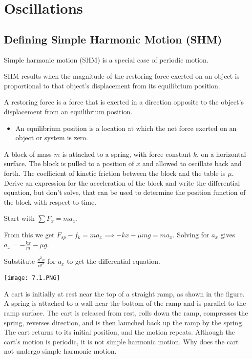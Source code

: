 \documentclass[../mech.tex]{subfiles}
\begin{document}
\chapter{Oscillations}
\section{Defining Simple Harmonic Motion (SHM)}
Simple harmonic motion (SHM) is a special case of periodic motion.

SHM results when the magnitude of the restoring force exerted on an object is proportional to that object's displacement from its equilibrium position.

A restoring force is a force that is exerted in a direction opposite to the object's displacement from an equilibrium position.
\begin{itemize}
    \item An equilibrium position is a location at which the net force exerted on an object or system is zero.
\end{itemize}

\begin{example}
    A block of mass $m$ is attached to a spring, with force constant $k$, on a horizontal surface. The block is pulled to a position of $x$ and allowed to oscillate back and forth.
    The coefficient of kinetic friction between the block and the table is $\mu$. Derive an expression for the acceleration of the block and write the differential equation, but don't solve, that can be used to determine the position 
    function of the block with respect to time.

    Start with $\sum F_x = ma_x$.

    From this we get $F_{sp}-f_k = ma_x \implies -kx -\mu mg = ma_x$. Solving for $a_x$ gives $a_x = -\frac{kx}{m}-\mu g$.

    Substitute $\frac{\dd^2 x}{\dd t^2}$ for $a_x$ to get the differential equation.
\end{example}

\ex \begin{center}
    \texttt{[image: 7.1.PNG]}
\end{center}
A cart is initially at rest near the top of a straight ramp, as shown in the figure. A spring is attached to a wall near the bottom of the ramp and is parallel to the ramp surface. The cart is released from rest, rolls down the ramp, compresses the spring, 
reverses direction, and is then launched back up the ramp by the spring. The cart returns to its initial position, and the motion repeats. Although the cart's motion is periodic, it is not simple harmonic motion. Why does the cart not undergo simple harmonic motion.
\end{document}

